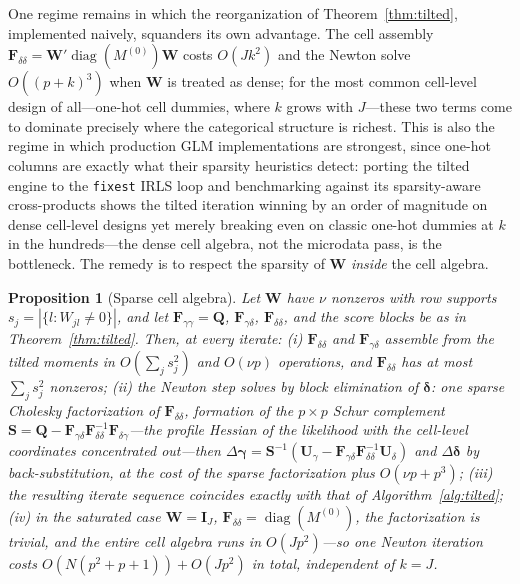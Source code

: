 \documentclass[11pt]{article}
\newtheorem{proposition}{Proposition}
\newcommand{\diag}{\operatorname{diag}}
\newcommand{\bgamma}{\bm{\gamma}}
\newcommand{\bdelta}{\bm{\delta}}
\newcommand{\bQ}{\mathbf{Q}}
\newcommand{\bF}{\mathbf{F}}
\newcommand{\bU}{\mathbf{U}}
\newcommand{\bW}{\mathbf{W}}
\newcommand{\bI}{\mathbf{I}}
\newcommand{\bS}{\mathbf{S}}
\begin{document}
One regime remains in which the reorganization of
Theorem~\ref{thm:tilted}, implemented naively, squanders its own
advantage.  The cell assembly
$\bF_{\delta\delta} = \bW'\diag(M^{(0)})\bW$ costs $O(Jk^2)$ and the
Newton solve $O((p+k)^3)$ when $\bW$ is treated as dense; for the most
common cell-level design of all---one-hot cell dummies, where $k$ grows
with $J$---these two terms come to dominate precisely where the
categorical structure is richest.  This is also the regime in which
production GLM implementations are strongest, since one-hot columns are
exactly what their sparsity heuristics detect: porting the tilted
engine to the \texttt{fixest} IRLS loop and benchmarking against its
sparsity-aware cross-products shows the tilted iteration winning by an
order of magnitude on dense cell-level designs yet merely breaking even
on classic one-hot dummies at $k$ in the hundreds---the dense cell
algebra, not the microdata pass, is the bottleneck.  The remedy is to
respect the sparsity of $\bW$ \emph{inside} the cell algebra.

\begin{proposition}[Sparse cell algebra]\label{prop:sparse-cells}
Let $\bW$ have $\nu$ nonzeros with row supports
$s_j = |\{l : W_{jl} \neq 0\}|$, and let
$\bF_{\gamma\gamma} = \bQ$, $\bF_{\gamma\delta}$,
$\bF_{\delta\delta}$, and the score blocks be as in
Theorem~\ref{thm:tilted}.  Then, at every iterate:
(i) $\bF_{\delta\delta}$ and $\bF_{\gamma\delta}$ assemble from the
tilted moments in $O(\sum_j s_j^2)$ and $O(\nu p)$ operations, and
$\bF_{\delta\delta}$ has at most $\sum_j s_j^2$ nonzeros;
(ii) the Newton step solves by block elimination of $\bdelta$: one
sparse Cholesky factorization of $\bF_{\delta\delta}$, formation of the
$p \times p$ Schur complement
$\bS = \bQ - \bF_{\gamma\delta}\bF_{\delta\delta}^{-1}
\bF_{\delta\gamma}$---the profile Hessian of the likelihood with the
cell-level coordinates concentrated out---then
$\Delta\bgamma = \bS^{-1}(\bU_\gamma -
\bF_{\gamma\delta}\bF_{\delta\delta}^{-1}\bU_\delta)$ and
$\Delta\bdelta$ by back-substitution, at the cost of the sparse
factorization plus $O(\nu p + p^3)$;
(iii) the resulting iterate sequence coincides exactly with that of
Algorithm~\ref{alg:tilted};
(iv) in the saturated case $\bW = \bI_J$,
$\bF_{\delta\delta} = \diag(M^{(0)})$, the factorization is trivial,
and the entire cell algebra runs in $O(Jp^2)$---so one Newton iteration
costs $O(N(p^2+p+1)) + O(Jp^2)$ in total, independent of $k = J$.
\end{proposition}
\end{document}
